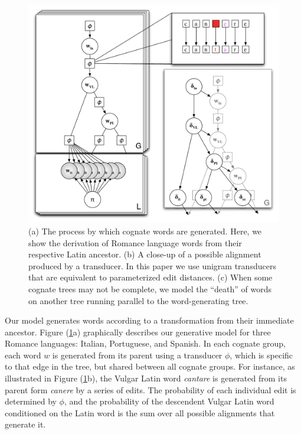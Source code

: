 \documentclass[11pt,a4paper]{article}
\begin{document}
\begin{figure}
  \centering
  \includegraphics[scale=0.4]{gmodel}
  \caption{(a) The process by which cognate words are generated.
  Here, we show the derivation of Romance language words from their
  respective Latin ancestor. (b) A close-up of a possible alignment
  produced by a transducer. In this paper we use unigram transducers
  that are equivalent to parameterized edit distances.  (c) When
  some cognate trees may not be complete, we model the ``death''
  of words on another tree running parallel to the word-generating
  tree.}

  \label{fig:gmodel}
\end{figure}

Our model generates words according to a transformation from their
immediate ancestor. Figure (\ref{fig:gmodel}a) graphically describes
our generative model for three Romance languages: Italian, Portuguese,
and Spanish. In each cognate group, each word $w$ is generated from
its parent using a transducer $\phi$, which is specific to that
edge in the tree, but shared between all cognate groups. For instance,
as illustrated in Figure (\ref{fig:gmodel}b), the Vulgar Latin word
\textit{cantare} is generated from its parent form \textit{canere}
by a series of edits. The probability of each individual edit is
determined by $\phi$, and the probability of the descendent Vulgar
Latin word conditioned on the Latin word is the sum over all possible
alignments that generate it.
\end{document}
